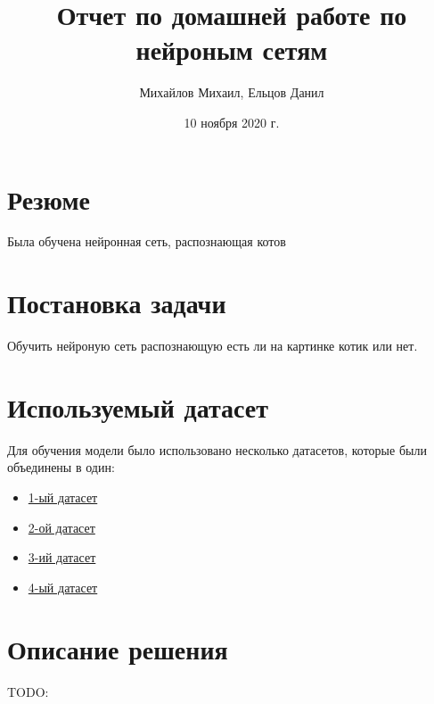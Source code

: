 \documentclass{article}
\title{Отчет по домашней работе по нейроным сетям}
\author{Михайлов Михаил, Ельцов Данил}
\date{10 ноября 2020 г.}
\begin{document}
\maketitle
\tableofcontents

\section*{Резюме}
Была обучена нейронная сеть, распознающая котов
\newpage
\section{Постановка задачи}
Обучить нейроную сеть распознающую есть ли на картинке котик или нет.

\section{Используемый датасет}
Для обучения модели было использовано несколько датасетов, которые были объединены в один:

\begin{itemize}
    \item \href{https://storage.googleapis.com/openimages/web/extended.html}{1-ый датасет}
    \item \href{https://www.kaggle.com/alessiocorrado99/animals10}{2-ой датасет}
    \item \href{https://www.kaggle.com/zippyz/cats-and-dogs-breeds-classification-oxford-dataset}{3-ий датасет}
    \item \href{https://www.kaggle.com/crawford/cat-dataset}{4-ый датасет}
\end{itemize}

\section{Описание решения}
TODO:
\end{document}
